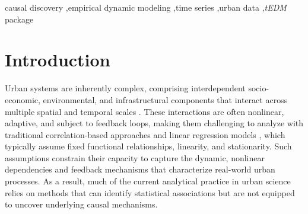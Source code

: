 \documentclass[authoryear,preprint,review,12pt]{elsarticle}
\begin{document}
\begin{frontmatter}
\begin{abstract}
Urban systems are complex, nonlinear, and adaptive, with interactions unfolding across multiple spatial and temporal scales. Traditional correlation-based and regression approaches often fail to capture their dynamic causal structures, limiting understanding of underlying mechanisms. Causal inference provides a more powerful framework, encompassing both causal discovery and causal effect estimation, yet the former remains underexplored in urban studies. Empirical Dynamic Modeling (EDM) is well suited for this task, as it reconstructs system dynamics directly from time series without prespecified models. Despite its potential, EDM has seen limited application in urban contexts. To address this gap, we introduce \textit{tEDM}, an open-source R package that extends EDM to heterogeneous, high-frequency, multivariate, and multi-spatial urban datasets. The package combines a C++ computational backbone with seamless R integration to achieve both efficiency and usability in large-scale urban time series analysis. Its applicability is illustrated through representative case studies on environmental health, carbon-climate dynamics, and epidemic spread, demonstrating how \textit{tEDM} enables nuanced causal discovery and provides methodological as well as practical advances for urban and environmental research. The \textit{tEDM} package is publicly available at \url{https://github.com/stscl/tEDM}.
\end{abstract}

\begin{keyword}
causal discovery \sep empirical dynamic modeling \sep time series \sep urban data \sep \textit{tEDM} package
\end{keyword}
\end{frontmatter}

\linenumbers

\section{Introduction}\label{sec_intro}

Urban systems are inherently complex, comprising interdependent socio-economic, environmental, and infrastructural components that interact across multiple spatial and temporal scales \citep{mcphearson2016understand_urban_systems}. These interactions are often nonlinear, adaptive, and subject to feedback loops, making them challenging to analyze with traditional correlation-based approaches and linear regression models \citep{gan2025urban_transfer_entropy}, which typically assume fixed functional relationships, linearity, and stationarity. Such assumptions constrain their capacity to capture the dynamic, nonlinear dependencies and feedback mechanisms that characterize real-world urban processes. As a result, much of the current analytical practice in urban science relies on methods that can identify statistical associations but are not equipped to uncover underlying causal mechanisms.
\end{document}
